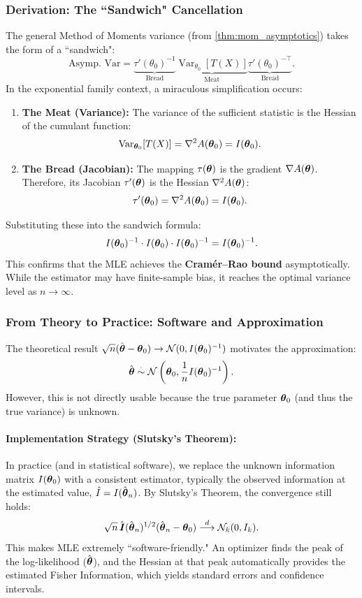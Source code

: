 \subsubsection{Derivation: The ``Sandwich" Cancellation}
The general Method of Moments variance (from \autoref{thm:mom_asymptotics}) takes the form of a ``sandwich":
\[
\text{Asymp. Var} = \underbrace{\tau'(\theta_0)^{-1}}_{\text{Bread}} \underbrace{\operatorname{Var}_{\theta_0}[T(X)]}_{\text{Meat}} \underbrace{\tau'(\theta_0)^{-\top}}_{\text{Bread}}.
\]
In the exponential family context, a miraculous simplification occurs:
\begin{enumerate}[]
    \item 
 \textbf{The Meat (Variance):} The variance of the sufficient statistic is the Hessian of the cumulant function:
    \[ \operatorname{Var}_{\boldsymbol{\theta}_0}[T(X)] = \nabla^2 A(\boldsymbol{\theta}_0) = I(\boldsymbol{\theta}_0). \]
\item   \textbf{The Bread (Jacobian):} The mapping $\tau(\boldsymbol{\theta})$ is the gradient $\nabla A(\boldsymbol{\theta})$. Therefore, its Jacobian $\tau'(\boldsymbol{\theta})$ is the Hessian $\nabla^2 A(\boldsymbol{\theta})$:
    \[ \tau'(\boldsymbol{\theta}_0) = \nabla^2 A(\boldsymbol{\theta}_0) = I(\boldsymbol{\theta}_0). \]
\end{enumerate}

Substituting these into the sandwich formula:
\[
I(\boldsymbol{\theta}_0)^{-1} \cdot I(\boldsymbol{\theta}_0) \cdot I(\boldsymbol{\theta}_0)^{-1} = I(\boldsymbol{\theta}_0)^{-1}.
\]
This confirms that the MLE achieves the \textbf{Cramér--Rao bound} asymptotically. While the estimator may have finite-sample bias, it reaches the optimal variance level as $n \to \infty$.

\subsubsection{From Theory to Practice: Software and Approximation}

The theoretical result $\sqrt{n}(\hat{\boldsymbol{\theta}} - \boldsymbol{\theta}_0) \to \mathcal{N}(0, I(\boldsymbol{\theta}_0)^{-1})$ motivates the approximation:
\[
\hat{\boldsymbol{\theta}} \stackrel{\cdot}{\sim} \mathcal{N}\left(\boldsymbol{\theta}_0, \frac{1}{n} I(\boldsymbol{\theta}_0)^{-1}\right).
\]
However, this is not directly usable because the true parameter $\boldsymbol{\theta}_0$ (and thus the true variance) is unknown.

\paragraph{Implementation Strategy (Slutsky's Theorem):}
In practice (and in statistical software), we replace the unknown information matrix $I(\boldsymbol{\theta}_0)$ with a consistent estimator, typically the observed information at the estimated value, $\hat{I} = I(\hat{\boldsymbol{\theta}}_n)$. By Slutsky's Theorem, the convergence still holds:
\[
\sqrt{n}\,\hat{\boldsymbol{I}}(\hat{\boldsymbol{\theta}}_n)^{1/2}(\hat{\boldsymbol{\theta}}_n-\boldsymbol{\theta}_0) \stackrel{d}{\longrightarrow} \mathcal{N}_k(0,I_k).
\]
This makes MLE extremely ``software-friendly." An optimizer finds the peak of the log-likelihood ($\hat{\boldsymbol{\theta}}$), and the Hessian at that peak automatically provides the estimated Fisher Information, which yields standard errors and confidence intervals.

